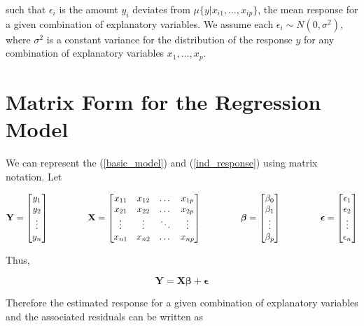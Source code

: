 \documentclass[]{book}
\begin{document}
such that \(\epsilon_i\) is the amount \(y_i\) deviates from
\(\mu\{y|x_{i1}, \ldots, x_{ip}\}\), the mean response for a given
combination of explanatory variables. We assume each
\(\epsilon_i \sim N(0,\sigma^2)\), where \(\sigma^2\) is a constant
variance for the distribution of the response \(y\) for any combination
of explanatory variables \(x_1, \ldots, x_p\).

\section{Matrix Form for the Regression
Model}\label{matrix-form-for-the-regression-model}

We can represent the (\ref{basic_model}) and (\ref{ind_response}) using
matrix notation. Let

\begin{equation}
\label{matrix notation}
\mathbf{Y} = \begin{bmatrix}y_1 \\ y_2 \\ \vdots \\y_n\end{bmatrix} 
\hspace{15mm}
\mathbf{X} = \begin{bmatrix}x_{11} & x_{12} & \dots & x_{1p} \\
x_{21} & x_{22} & \dots & x_{2p} \\
\vdots & \vdots & \ddots & \vdots\\
x_{n1} & x_{n2} & \dots & x_{np} \end{bmatrix}
\hspace{15mm}
\boldsymbol{\beta}= \begin{bmatrix}\beta_0 \\ \beta_1 \\ \vdots \\ \beta_p \end{bmatrix} 
\hspace{15mm}
\boldsymbol{\epsilon}= \begin{bmatrix}\epsilon_1 \\ \epsilon_2 \\ \vdots \\ \epsilon_n \end{bmatrix}
\end{equation}

Thus,

\[\mathbf{Y} = \mathbf{X}\boldsymbol{\beta} + \mathbf{\epsilon}\]

Therefore the estimated response for a given combination of explanatory
variables and the associated residuals can be written as
\end{document}
